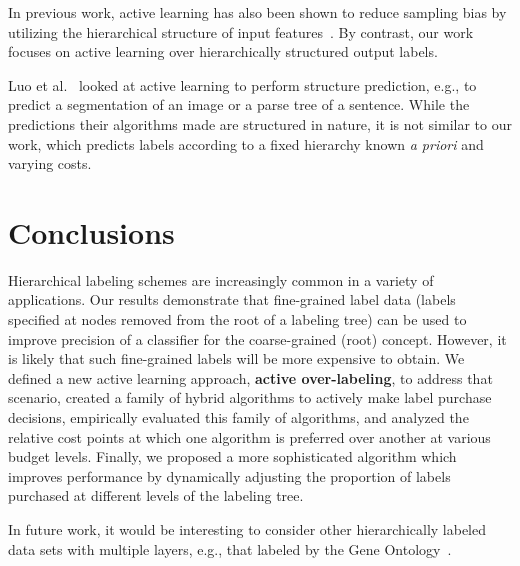 \documentclass[10pt, conference, compsocconf]{IEEEtran}
\begin{document}
In previous work, active learning has also been shown 
to reduce sampling bias by utilizing the hierarchical structure of input
features~\cite{Dasgupta2008, Symons2006}. By contrast, 
our work focuses on active learning over hierarchically
structured output labels.

Luo et al.~\cite{lsu-lsal-13} looked at active learning to perform structure
prediction, e.g., to predict a segmentation of an image or a parse tree of a
sentence.  While the predictions their algorithms made are structured in
nature, it is not similar to our work, which predicts labels according to a
fixed hierarchy known {\em a priori} and varying costs.

\section{Conclusions}
\label{sec:concl}

Hierarchical labeling schemes are increasingly common in a variety
of applications.  Our results demonstrate that fine-grained label
data (labels specified at nodes removed from the root of a labeling
tree) can be used to improve precision of a classifier for the
coarse-grained (root) concept.  However, it is likely that such
fine-grained labels will be more expensive to obtain.  We defined
a new active learning approach, {\bf active over-labeling}, to address that scenario, created a family of
hybrid algorithms to actively make label purchase decisions, 
empirically evaluated this family of algorithms, and analyzed the 
relative cost points at which one algorithm is preferred over another
at various budget levels. Finally, we proposed a more sophisticated algorithm
which improves performance by dynamically adjusting the proportion of labels 
purchased at different levels of the labeling tree.

In future work, it would be
interesting to consider other hierarchically labeled data sets with multiple layers, e.g.,
that labeled by the Gene Ontology~\cite{GeneOntology}.





%
%
\end{document}
